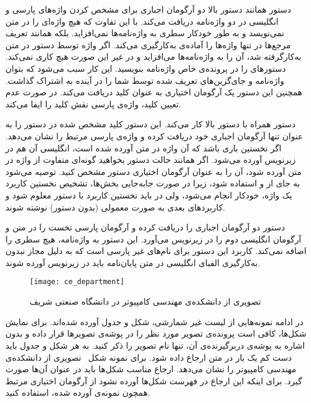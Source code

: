 	 دستور  همانند دستور بالا دو آرگومان اجباری برای مشخص کردن واژه‌های پارسی و انگلیسی در دو واژه‌نامه دریافت می‌کند. با این تفاوت که هیچ واژه‌ای را در متن نمی‌نویسد و به طور خودکار سطری به واژه‌نامه‌ها نمی‌افزاید. بلکه همانند تعریف مرجع‌ها در  تنها واژه‌ها را آماده‌ی به‌کارگیری می‌کند. اگر واژه توسط دستور  در متن به‌کارگرفته شد، آن را به واژه‌نامه‌ها می‌افزاید و در غیر این صورت هیچ کاری نمی‌کند. دستورهای  را در پرونده‌ی خاص واژه‌نامه بنویسید. این کار سبب می‌شود که بتوان واژه‌نامه و جای‌گزین‌های تعریف شده توسط شما را در آینده به اشتراک گذاشت. همچنین این دستور یک آرگومان اختیاری به عنوان کلید دریافت می‌کند. در صورت عدم تعیین کلید، واژه‌ی پارسی نقش کلید را ایفا می‌کند.
	
	 دستور  همراه با دستور بالا کار می‌کند. این دستور کلید مشخص شده در دستور  را به عنوان تنها آرگومان اجباری خود دریافت کرده و واژه‌ی پارسی مرتبط را نشان می‌دهد. اگر نخستین باری باشد که آن واژه در متن آورده شده است، انگلیسی آن هم در زیرنویس آورده می‌شود. اگر همانند حالت دستور  بخواهید گونه‌ای متفاوت از واژه در متن آورده شود، آن را به عنوان آرگومان اختیاری دستور  مشخص کنید. توصیه می‌شود به جای  از  و  استفاده شود، زیرا در صورت جابه‌جایی بخش‌ها، تشخیص نخستین کاربرد یک واژه، خودکار انجام می‌شود، ولی در  باید نخستین کاربرد با دستور  معلوم شود و کاربردهای بعدی به صورت معمولی (بدون دستور) نوشته شوند.
	
	 دستور  دو آرگومان اجباری را دریافت کرده و آرگومان پارسی تخست را در متن و آرگومان انگلیسی دوم را در زیرنویس  می‌آورد. این دستور به واژه‌نامه، هیچ سطری را اضافه نمی‌کند. کاربرد این دستور برای نام‌های غیر پارسی است که به دلیل مجاز نبدون به‌کارگیری الفبای انگلیسی در متن پایان‌نامه باید در زیرنویس آورده شوند.


\begin{figure}[tbp]
\centering
\texttt{[image: ce\_department]}
\def\mytempcaption{تصویری از دانشکده‌ی مهندسی کامپیوتر در دانشگاه صنعتی شریف}
\caption[\mytempcaption]{\mytempcaption~\cite{sharif:cesite}}
\label{fig:cedepartment}
\end{figure}

در ادامه نمونه‌هایی از لیست غیر شمارشی، شکل و جدول آورده شده‌اند. برای نمایش شکل‌ها، کافی است پرونده‌ی تصویر مورد نظر را در پوشه‌ی تصویرها قرار داده و بدون اشاره به پوشه‌ی دربرگیرنده‌ی آن، تنها نام تصویر را ذکر کنید. به هر شکل و جدول باید دست کم یک بار در متن ارجاع داده شود. برای نمونه شکل~ تصویری از دانشکده‌ی مهندسی کامپیوتر را نشان می‌دهد. ارجاع مناسب شکل‌ها باید در عنوان آن‌ها صورت گیرد. برای اینکه این ارجاع در فهرست شکل‌ها آورده نشود از آرگومان اختیاری مرتبط همچون نمونه‌ی آورده شده، استفاده کنید.


